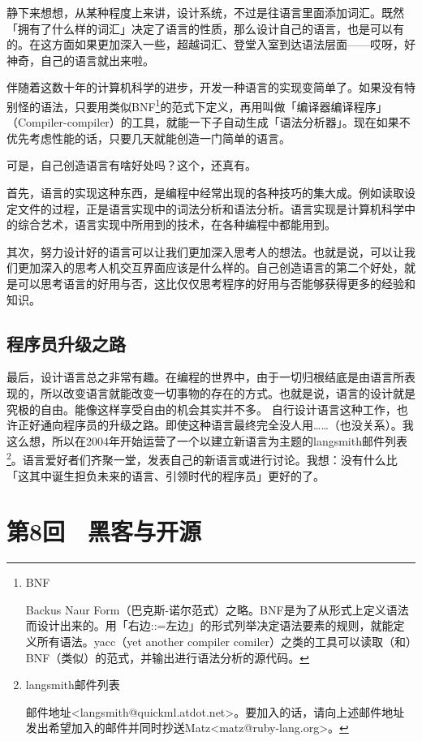 \documentclass[a4paper,12pt]{article}
\begin{document}
静下来想想，从某种程度上来讲，设计系统，不过是往语言里面添加词汇。既然「拥有了什么样的词汇」决定了语言的性质，那么设计自己的语言，也是可以有的。在这方面如果更加深入一些，超越词汇、登堂入室到达语法层面——哎呀，好神奇，自己的语言就出来啦。

伴随着这数十年的计算机科学的进步，开发一种语言的实现变简单了。如果没有特别怪的语法，只要用类似BNF\footnote{BNF

  Backus Naur Form（巴克斯-诺尔范式）之略。BNF是为了从形式上定义语法而设计出来的。用「右边::=左边」的形式列举决定语法要素的规则，就能定义所有语法。yacc（yet another compiler comiler）之类的工具可以读取（和）BNF（类似）的范式，并输出进行语法分析的源代码。}的范式下定义，再用叫做「编译器编译程序」（Compiler-compiler）的工具，就能一下子自动生成「语法分析器」。现在如果不优先考虑性能的话，只要几天就能创造一门简单的语言。

可是，自己创造语言有啥好处吗？这个，还真有。

首先，语言的实现这种东西，是编程中经常出现的各种技巧的集大成。例如读取设定文件的过程，正是语言实现中的词法分析和语法分析。语言实现是计算机科学中的综合艺术，语言实现中所用到的技术，在各种编程中都能用到。

其次，努力设计好的语言可以让我们更加深入思考人的想法。也就是说，可以让我们更加深入的思考人机交互界面应该是什么样的。自己创造语言的第二个好处，就是可以思考语言的好用与否，这比仅仅思考程序的好用与否能够获得更多的经验和知识。

\subsection{程序员升级之路}

最后，设计语言总之非常有趣。在编程的世界中，由于一切归根结底是由语言所表现的，所以改变语言就能改变一切事物的存在的方式。也就是说，语言的设计就是究极的自由。能像这样享受自由的机会其实并不多。
自行设计语言这种工作，也许正好通向程序员的升级之路。即使这种语言最终完全没人用……（也没关系）。我这么想，所以在2004年开始运营了一个以建立新语言为主题的langsmith邮件列表\footnote{langsmith邮件列表

  邮件地址<langsmith@quickml.atdot.net>。要加入的话，请向上述邮件地址发出希望加入的邮件并同时抄送Matz<matz@ruby-lang.org>。}。语言爱好者们齐聚一堂，发表自己的新语言或进行讨论。我想：没有什么比「这其中诞生担负未来的语言、引领时代的程序员」更好的了。


\section{第8回　黑客与开源}
\end{document}
